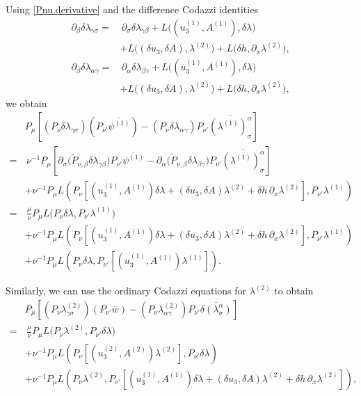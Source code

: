 \documentclass[11pt,letterpaper,reqno]{amsart}
\numberwithin{equation}{section}
\theoremstyle{definition}
\theoremstyle{remark}
\begin{document}
Using \eqref{Pnu.derivative} 
and the difference Codazzi identities
\begin{align}
\partial_\beta\delta\lambda_{\gamma\sigma}
=&\,
\partial_\sigma\delta\lambda_{\gamma\beta}
+
L\bigl((u_3^{(1)},A^{(1)}),\delta\lambda\bigr)
\nonumber\\
&+
L\bigl((\delta u_3,\delta A),\lambda^{(2)}\bigr)
+
L\bigl(\delta h,\partial_x\lambda^{(2)}\bigr),
\label{difference-codazzi-1}
\\
\partial_\beta\delta\lambda_{\alpha\gamma}
=&\,
\partial_\alpha\delta\lambda_{\beta\gamma}
+
L\bigl((u_3^{(1)},A^{(1)}),\delta\lambda\bigr)
\nonumber\\
&+
L\bigl((\delta u_3,\delta A),\lambda^{(2)}\bigr)
+
L\bigl(\delta h,\partial_x\lambda^{(2)}\bigr),
\label{difference-codazzi-2}
\end{align}
we obtain
\begin{align}
& P_\mu
\left[
(P_\nu\delta\lambda_{\gamma\sigma})
(P_{\nu'}\overline{\psi^{(1)}})
-
(P_\nu\delta\lambda_{\alpha\gamma})
P_{\nu'}\overline{(\lambda^{(1)})^\alpha_\sigma}
\right]
\nonumber\\
=&\,
\nu^{-1}P_\mu
\left[
\partial_\sigma
\bigl(
\widetilde P_{\nu,\beta}
\delta\lambda_{\gamma\beta}
\bigr)
P_{\nu'}\overline{\psi^{(1)}}
-
\partial_\alpha
\bigl(
\widetilde P_{\nu,\beta}
\delta\lambda_{\beta\gamma}
\bigr)
P_{\nu'}\overline{(\lambda^{(1)})^\alpha_\sigma}
\right]
\nonumber\\
&+
\nu^{-1}P_\mu
L\left(
P_\nu
\left[
(u_3^{(1)},A^{(1)})\delta\lambda
+
(\delta u_3,\delta A)\lambda^{(2)}
+
\delta h\,\partial_x\lambda^{(2)}
\right],
P_{\nu'}\lambda^{(1)}
\right) \nonumber\\
=&\,\frac{\mu}{\nu}
P_\mu
L\bigl(
P_\nu\delta\lambda,
P_{\nu'}\lambda^{(1)}
\bigr)
\nonumber\\
&+
\nu^{-1}P_\mu
L\left(
P_\nu
\left[
(u_3^{(1)},A^{(1)})\delta\lambda
+
(\delta u_3,\delta A)\lambda^{(2)}
+
\delta h\,\partial_x\lambda^{(2)}
\right],
P_{\nu'}\lambda^{(1)}
\right)
\nonumber\\
&+
\nu^{-1}P_\mu
L\left(
P_\nu\delta\lambda,
P_{\nu'}
\left[
(u_3^{(1)},A^{(1)})\lambda^{(1)}
\right]
\right).
\label{first-polarized-final}
\end{align}
  
Similarly,   we can use the ordinary Codazzi equations for
\(\lambda^{(2)}\) to  obtain
\begin{align}
& P_\mu
\left[
(P_\nu\lambda_{\gamma\sigma}^{(2)})
(P_{\nu'}\overline{w})
-
(P_\nu\lambda_{\alpha\gamma}^{(2)})
P_{\nu'}\overline{\delta(\lambda^\alpha_\sigma)}
\right]
\nonumber\\
=&\, \frac{\mu}{\nu}
P_\mu
L\bigl(
P_\nu\lambda^{(2)},
P_{\nu'}\delta\lambda
\bigr)
\nonumber\\
&+
\nu^{-1}P_\mu
L\left(
P_\nu
\left[
(u_3^{(2)},A^{(2)})\lambda^{(2)}
\right],
P_{\nu'}\delta\lambda
\right)
\label{second-polarized-final}\\
&+
\nu^{-1}P_\mu
L\left(
P_\nu\lambda^{(2)},
P_{\nu'}
\left[
(u_3^{(1)},A^{(1)})\delta\lambda
+
(\delta u_3,\delta A)\lambda^{(2)}
+
\delta h\,\partial_x\lambda^{(2)}
\right]
\right),
\nonumber
\end{align}
 
\end{document}
